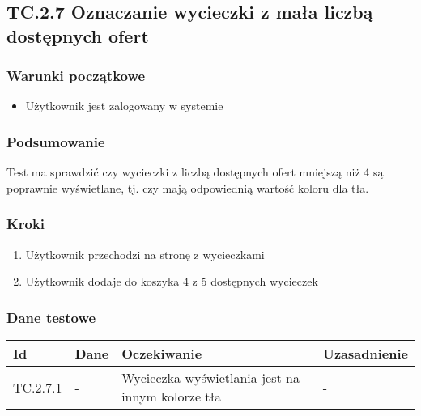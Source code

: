 \documentclass[a4paper,15pt]{article}
\begin{document}
\newpage
\begin{framed}
\subsection{TC.2.7 Oznaczanie wycieczki z mała liczbą dostępnych ofert}


\vspace{0.5cm}

\subsubsection{Warunki początkowe}
\begin{itemize}
\item Użytkownik jest zalogowany w systemie
\end{itemize}

\subsubsection{Podsumowanie}
Test ma sprawdzić czy wycieczki z liczbą dostępnych ofert mniejszą niż 4 są poprawnie wyświetlane, tj. czy mają odpowiednią wartość koloru dla tła. 

\subsubsection{Kroki}
\begin{enumerate}
\item Użytkownik przechodzi na stronę z wycieczkami
\item Użytkownik dodaje do koszyka 4 z 5 dostępnych wycieczek
\end{enumerate}

\subsubsection{Dane testowe}

\begin{center}
\begin{tabular}{ |C{1.5cm}|C{3cm}|C{4cm}|C{4cm}| } 
 \hline
 \textbf{Id} & \textbf{Dane} & \textbf{Oczekiwanie} & \textbf{Uzasadnienie} \\ \hline
 TC.2.7.1 & - & Wycieczka wyświetlania jest na innym kolorze tła & - \\ \hline
\end{tabular}
\end{center}

\end{framed}
\end{document}
